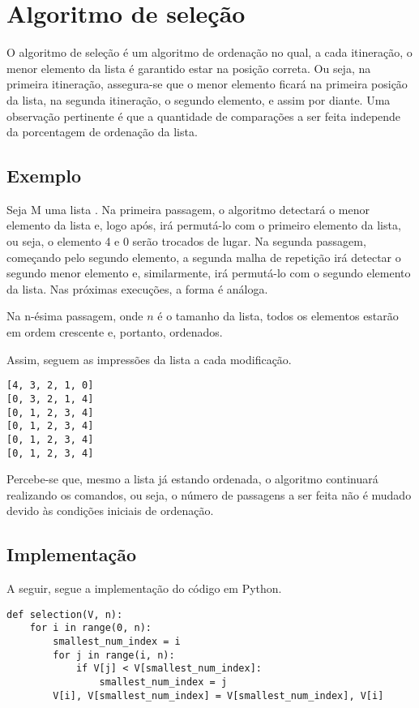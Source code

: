 \section{Algoritmo de seleção}
O algoritmo de seleção é um algoritmo de ordenação no qual, a cada itineração, o menor elemento da lista é garantido estar na posição correta. Ou seja, na primeira itineração, assegura-se que o menor elemento ficará na primeira posição da lista, na segunda itineração, o segundo elemento, e assim por diante. 
Uma observação pertinente é que a quantidade de comparações a ser feita independe da porcentagem de ordenação da lista.

\subsection{Exemplo}
Seja M uma lista \code{[4,3,2,1,0]}. Na primeira passagem, o algoritmo detectará o menor elemento da lista e, logo após, irá permutá-lo com o primeiro elemento da lista, ou seja, o elemento 4 e 0 serão trocados de lugar. Na segunda passagem, começando pelo segundo elemento, a segunda malha de repetição irá detectar o segundo menor elemento e, similarmente, irá permutá-lo com o segundo elemento da lista. Nas próximas execuções, a forma é análoga.

Na n-ésima passagem, onde $n$ é o tamanho da lista, todos os elementos estarão em ordem crescente e, portanto, ordenados.

Assim, seguem as impressões da lista a cada modificação.

\begin{lstlisting}
[4, 3, 2, 1, 0]
[0, 3, 2, 1, 4]
[0, 1, 2, 3, 4]
[0, 1, 2, 3, 4]
[0, 1, 2, 3, 4]
[0, 1, 2, 3, 4]
\end{lstlisting}

Percebe-se que, mesmo a lista já estando ordenada, o algoritmo continuará realizando os comandos, ou seja, o número de passagens a ser feita não é mudado devido às condições iniciais de ordenação.

\newpage
\subsection{Implementação}
A seguir, segue a implementação do código em Python.

\begin{lstlisting}
def selection(V, n):
    for i in range(0, n):
        smallest_num_index = i
        for j in range(i, n):
            if V[j] < V[smallest_num_index]:
                smallest_num_index = j
        V[i], V[smallest_num_index] = V[smallest_num_index], V[i]

\end{lstlisting}

